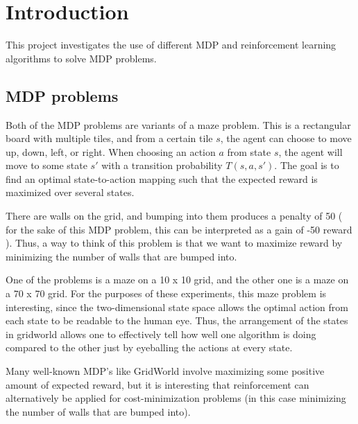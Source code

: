 \documentclass[11pt]{article}
\begin{document}
        \section{Introduction}
            
            This project investigates the use of different MDP and reinforcement learning
            algorithms to solve MDP problems.

            \subsection{MDP problems}

            Both of the MDP problems are variants of a maze problem. This is a rectangular board
            with multiple tiles, and from a certain tile $s$, the agent can choose to move
            up, down, left, or right. When choosing an action $a$ from state $s$, the agent
            will move to some state $s'$ with a transition probability $T(s, a, s')$. The
            goal is to find an optimal state-to-action mapping such that the expected reward
            is maximized over several states.

            There are walls on the grid, and bumping into them produces a penalty of 50 (
            for the sake of this MDP problem, this can be interpreted as a gain of -50
            reward
            ). Thus, a way to think of this problem is that we want to maximize reward
            by minimizing the number of walls that are bumped into.
            
            One of the problems is a maze on a 10 x 10 grid, and the other one is
            a maze on a 70 x 70 grid. For the purposes of these experiments, %
            this maze problem is interesting, since the two-dimensional state space allows the
            optimal action from each state to be readable to the human eye. Thus,
            the arrangement of the states in gridworld allows one to effectively tell
            how well one algorithm is doing compared to the other just by eyeballing the
            actions at every state.

            Many well-known MDP's like GridWorld involve maximizing some positive
            amount of expected reward, but it is interesting that reinforcement can
            alternatively be applied for cost-minimization problems (in this case
            minimizing the number of walls that are bumped into).
            
\end{document}
